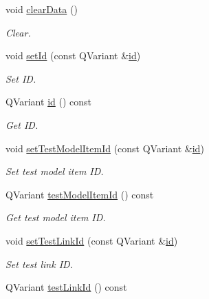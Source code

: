 \begin{DoxyCompactItemize}
\item 
void \hyperlink{classmdt_tt_test_model_item_route_data_a2d247da5bc9d377d5dafbb1080d65be6}{clear\-Data} ()
\begin{DoxyCompactList}\small\item\em Clear. \end{DoxyCompactList}\item 
void \hyperlink{classmdt_tt_test_model_item_route_data_a40e5fe46e70a9a7ffc2e5f3d8171b679}{set\-Id} (const Q\-Variant \&\hyperlink{classmdt_tt_test_model_item_route_data_ad34638a6361e64a867f30821b73ff385}{id})
\begin{DoxyCompactList}\small\item\em Set I\-D. \end{DoxyCompactList}\item 
Q\-Variant \hyperlink{classmdt_tt_test_model_item_route_data_ad34638a6361e64a867f30821b73ff385}{id} () const 
\begin{DoxyCompactList}\small\item\em Get I\-D. \end{DoxyCompactList}\item 
void \hyperlink{classmdt_tt_test_model_item_route_data_a2180aaa63197ce3540638e256ae2acb6}{set\-Test\-Model\-Item\-Id} (const Q\-Variant \&\hyperlink{classmdt_tt_test_model_item_route_data_ad34638a6361e64a867f30821b73ff385}{id})
\begin{DoxyCompactList}\small\item\em Set test model item I\-D. \end{DoxyCompactList}\item 
Q\-Variant \hyperlink{classmdt_tt_test_model_item_route_data_aad243db97f2cea833fd2ff61c98ec0df}{test\-Model\-Item\-Id} () const 
\begin{DoxyCompactList}\small\item\em Get test model item I\-D. \end{DoxyCompactList}\item 
void \hyperlink{classmdt_tt_test_model_item_route_data_a6255e53365aceedba51858172b3622ca}{set\-Test\-Link\-Id} (const Q\-Variant \&\hyperlink{classmdt_tt_test_model_item_route_data_ad34638a6361e64a867f30821b73ff385}{id})
\begin{DoxyCompactList}\small\item\em Set test link I\-D. \end{DoxyCompactList}\item 
Q\-Variant \hyperlink{classmdt_tt_test_model_item_route_data_a7c58642d4e7ef24dac1d27f7e4be41ee}{test\-Link\-Id} () const 

\end{DoxyCompactItemize}
